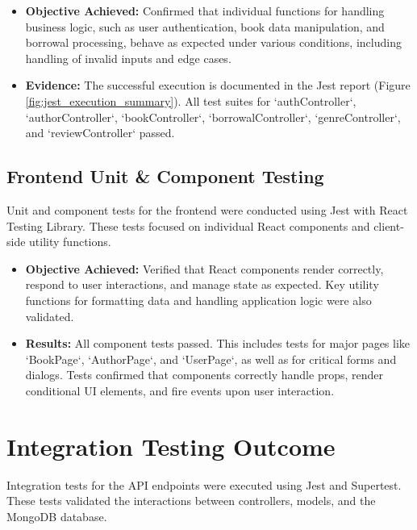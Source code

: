 \begin{itemize}
    \item \textbf{Objective Achieved:} Confirmed that individual functions for handling business logic, such as user authentication, book data manipulation, and borrowal processing, behave as expected under various conditions, including handling of invalid inputs and edge cases.
    \item \textbf{Evidence:} The successful execution is documented in the Jest report (Figure \ref{fig:jest_execution_summary}). All test suites for `authController`, `authorController`, `bookController`, `borrowalController`, `genreController`, and `reviewController` passed.
\end{itemize}

\subsection{Frontend Unit \& Component Testing}
Unit and component tests for the frontend were conducted using Jest with React Testing Library. These tests focused on individual React components and client-side utility functions.

\begin{itemize}
    \item \textbf{Objective Achieved:} Verified that React components render correctly, respond to user interactions, and manage state as expected. Key utility functions for formatting data and handling application logic were also validated.
    \item \textbf{Results:} All component tests passed. This includes tests for major pages like `BookPage`, `AuthorPage`, and `UserPage`, as well as for critical forms and dialogs. Tests confirmed that components correctly handle props, render conditional UI elements, and fire events upon user interaction.
\end{itemize}

\section{Integration Testing Outcome}
\label{sec:integration_testing_outcome}
Integration tests for the API endpoints were executed using Jest and Supertest. These tests validated the interactions between controllers, models, and the MongoDB database.

